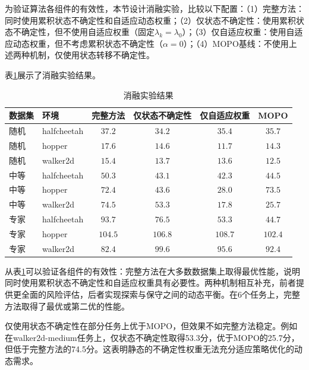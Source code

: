 为验证算法各组件的有效性，本节设计消融实验，比较以下配置：（1）完整方法：同时使用累积状态不确定性和自适应动态权重；（2）仅状态不确定性：使用累积状态不确定性，但不使用自适应权重（固定$\lambda_k = \lambda_0$）；（3）仅自适应权重：使用自适应动态权重，但不考虑累积状态不确定性（$\alpha = 0$）；（4）MOPO基线：不使用上述两种机制，仅使用状态转移不确定性。

表\ref{Tab:Chap3_ablation}展示了消融实验结果。

\begin{table}[htbp]
  \centering
  \caption{消融实验结果}
  \label{Tab:Chap3_ablation}
  \begin{tabular}{llcccc}
    \toprule
    数据集 & 环境          & 完整方法            & 仅状态不确定性          & 仅自适应权重  & MOPO            \\
    \midrule
    随机  & halfcheetah & $\mathbf{37.2}$ & $34.2$           & $35.4$  & $35.7$          \\
    随机  & hopper      & $\mathbf{17.6}$ & $14.6$           & $11.7$  & $14.3$          \\
    随机  & walker2d    & $\mathbf{15.4}$ & $13.7$           & $13.6$  & $12.5$          \\
    中等  & halfcheetah & $\mathbf{50.3}$ & $43.1$           & $42.3$  & $44.5$          \\
    中等  & hopper      & $72.4$          & $43.6$           & $28.0$  & $\mathbf{73.5}$ \\
    中等  & walker2d    & $\mathbf{74.5}$ & $53.3$           & $17.8$  & $25.7$          \\
    专家  & halfcheetah & $\mathbf{93.7}$ & $76.5$           & $53.3$  & $44.7$          \\
    专家  & hopper      & $104.5$         & $\mathbf{106.8}$ & $108.7$ & $102.4$         \\
    专家  & walker2d    & $82.4$          & $\mathbf{99.6}$  & $95.6$  & $92.4$          \\
    \bottomrule
  \end{tabular}
\end{table}

从表\ref{Tab:Chap3_ablation}可以验证各组件的有效性：完整方法在大多数数据集上取得最优性能，说明同时使用累积状态不确定性和自适应权重具有必要性。两种机制相互补充，前者提供更全面的风险评估，后者实现探索与保守之间的动态平衡。在6个任务上，完整方法取得了最优或第二优的性能。

仅使用状态不确定性在部分任务上优于MOPO，但效果不如完整方法稳定。例如在walker2d-medium任务上，仅状态不确定性取得53.3分，优于MOPO的25.7分，但低于完整方法的74.5分。这表明静态的不确定性权重无法充分适应策略优化的动态需求。

